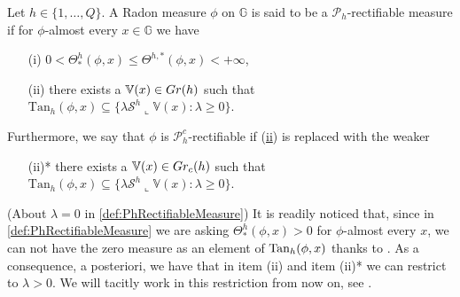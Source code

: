 \documentclass[10pt, a4paper,
oneside, headinclude,footinclude]{scrartcl}
\begin{document}
\begin{definizione}\label{def:PhRectifiableMeasure}
Let $h\in\{1,\ldots,Q\}$. A Radon measure $\phi$ on $\mathbb G$ is said to be a $\mathscr{P}_h$-rectifiable measure if for $\phi$-almost every $x\in \mathbb{G}$ we have
\begin{itemize}
    \item[(i)]$0<\Theta^h_*(\phi,x)\leq\Theta^{h,*}(\phi,x)<+\infty$,
    \item[(\hypertarget{due}{ii})]there exists a $\mathbb{V}(x)\in Gr(h)$ such that $\mathrm{Tan}_h(\phi,x) \subseteq \{\lambda\mathcal{S}^h\llcorner \mathbb V(x):\lambda\geq 0\}$.
\end{itemize}
Furthermore, we say that $\phi$ is $\mathscr{P}_h^c$-rectifiable if (\hyperlink{due}{ii})  is replaced with the weaker
\begin{itemize}
    \item[(ii)*] there exists a $\mathbb{V}(x)\in Gr_c(h)$ such that $\mathrm{Tan}_h(\phi,x) \subseteq \{\lambda\mathcal{S}^h\llcorner \mathbb V(x):\lambda\geq 0\}$.
\end{itemize}
\end{definizione}
\begin{osservazione}(About $\lambda=0$ in \cref{def:PhRectifiableMeasure})\label{rem:AboutLambda=0}
It is readily noticed that, since in \cref{def:PhRectifiableMeasure} we are asking $\Theta^h_*(\phi,x)>0$ for $\phi$-almost every $x$, we can not have the zero measure as an element of $\mathrm{Tan}_h(\phi,x)$ thanks to \cite[Proposition 2.26]{antonelli2020rectifiable}. As a consequence, a posteriori, we have that in item (ii) and item (ii)* we can restrict to $\lambda>0$. We will tacitly work in this restriction from now on, see \cite[Remark 2.7]{antonelli2020rectifiable}.

\end{osservazione}
\end{document}
